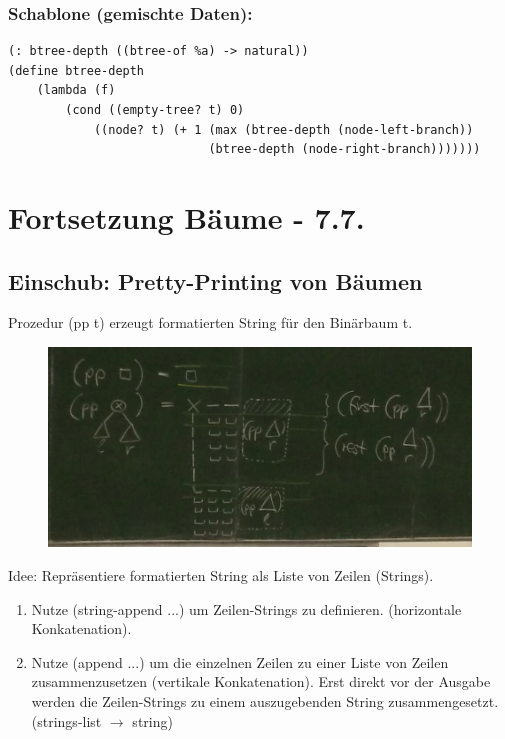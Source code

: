 \documentclass[a4paper, 20pt, openany]{book}
\begin{document}
\subsection{Schablone (gemischte Daten):}
\begin{lstlisting}
(: btree-depth ((btree-of %a) -> natural))
(define btree-depth
	(lambda (f)
		(cond ((empty-tree? t) 0)
			((node? t) (+ 1 (max (btree-depth (node-left-branch))
   							(btree-depth (node-right-branch)))))))
\end{lstlisting}

\chapter{Fortsetzung Bäume - 7.7.}
\section{Einschub: Pretty-Printing von Bäumen}
Prozedur (pp t) erzeugt formatierten String für den Binärbaum t.\\

\begin{figure}[ht]
	\centering
  \includegraphics[width=1\textwidth, angle=0]{pretty_printing.jpg}
	\label{fig1}
\end{figure}


Idee: Repräsentiere formatierten String als Liste von Zeilen (Strings).\\
\begin{enumerate}
\item Nutze (string-append ...) um Zeilen-Strings zu definieren. (horizontale Konkatenation).\\
\item Nutze (append ...) um die einzelnen Zeilen zu einer Liste von Zeilen zusammenzusetzen (vertikale Konkatenation).
Erst direkt vor der Ausgabe werden die Zeilen-Strings zu einem auszugebenden String zusammengesetzt. (strings-list $\rightarrow$ string)
\end{enumerate}
\end{document}
